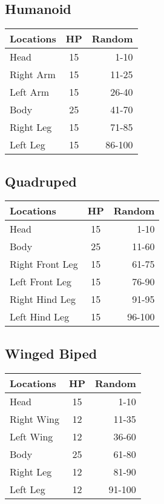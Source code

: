 \pagebreak
\begin{multicols}{2}
\subsection{Humanoid}
\begin{minipage}{\columnwidth}
	\begin{tabularx}{\columnwidth}{|X|c|r|}
		\hline
		Locations & HP & Random \\ \hline
		Head      & 15 &   1-10 \\ \hline
		Right Arm & 15 &  11-25 \\ \hline
		Left Arm  & 15 &  26-40 \\ \hline
		Body      & 25 &  41-70 \\ \hline
		Right Leg & 15 &  71-85 \\ \hline
		Left Leg  & 15 & 86-100 \\ \hline
	\end{tabularx}
\end{minipage}

\subsection{Quadruped}
\begin{minipage}{\columnwidth}
	\begin{tabularx}{\columnwidth}{|X|c|r|}
		\hline
		Locations       & HP & Random \\ \hline
		Head            & 15 &   1-10 \\ \hline
		Body            & 25 &  11-60 \\ \hline
		Right Front Leg & 15 &  61-75 \\ \hline
		Left Front Leg  & 15 &  76-90 \\ \hline
		Right Hind Leg  & 15 &  91-95 \\ \hline
		Left Hind Leg   & 15 & 96-100 \\ \hline
	\end{tabularx}
\end{minipage}

\subsection{Winged Biped}
\begin{minipage}{\columnwidth}
	\begin{tabularx}{\columnwidth}{|X|c|r|}
		\hline
		Locations  & HP & Random \\ \hline
		Head       & 15 &   1-10 \\ \hline
		Right Wing & 12 &  11-35 \\ \hline
		Left Wing  & 12 &  36-60 \\ \hline
		Body       & 25 &  61-80 \\ \hline
		Right Leg  & 12 &  81-90 \\ \hline
		Left Leg   & 12 & 91-100 \\ \hline
	\end{tabularx}
\end{minipage}


\end{multicols}
